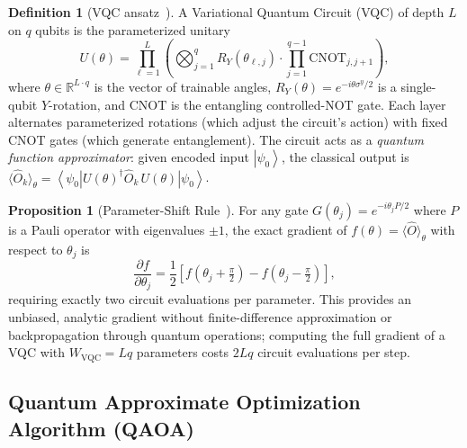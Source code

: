 \documentclass[11pt,a4paper]{article}
\theoremstyle{definition}
\newtheorem{definition}{Definition}[section]
\newtheorem{proposition}{Proposition}[section]
\newcommand{\ket}[1]{\left\lvert #1 \right\rangle}
\newcommand{\bra}[1]{\left\langle #1 \right\rvert}
\begin{document}
\begin{definition}[VQC ansatz~{\cite{vqc_drl}}]
\label{def:vqc_ansatz}
A Variational Quantum Circuit (VQC) of depth $L$ on $q$ qubits is the parameterized unitary
\begin{equation}
  U(\theta) = \prod_{\ell=1}^{L}
  \left(\bigotimes_{j=1}^{q} R_Y(\theta_{\ell,j})
  \cdot \prod_{j=1}^{q-1}\mathrm{CNOT}_{j,j+1}\right),
  \label{eq:vqc_def}
\end{equation}
where $\theta \in \mathbb{R}^{L \cdot q}$ is the vector of trainable angles, $R_Y(\theta)=e^{-i\theta\sigma^y/2}$ is a single-qubit $Y$-rotation, and $\mathrm{CNOT}$ is the entangling controlled-NOT gate. Each layer alternates parameterized rotations (which adjust the circuit's action) with fixed CNOT gates (which generate entanglement). The circuit acts as a \emph{quantum function approximator}: given encoded input $\ket{\psi_0}$, the classical output is $\langle\hat{O}_k\rangle_\theta = \bra{\psi_0}U(\theta)^\dagger\hat{O}_k\,U(\theta)\ket{\psi_0}$.
\end{definition}

\begin{proposition}[Parameter-Shift Rule~{\cite{mitarai2018psr,vqc_drl}}]
\label{prop:psr}
For any gate $G(\theta_j) = e^{-i\theta_j P/2}$ where $P$ is a Pauli operator with eigenvalues $\pm 1$, the exact gradient of $f(\theta) = \langle\hat{O}\rangle_\theta$ with respect to $\theta_j$ is
\begin{equation}
  \frac{\partial f}{\partial \theta_j}
  = \frac{1}{2}\!\left[f\!\left(\theta_j + \tfrac{\pi}{2}\right)
  - f\!\left(\theta_j - \tfrac{\pi}{2}\right)\right],
  \label{eq:psr}
\end{equation}
requiring exactly two circuit evaluations per parameter. This provides an unbiased, analytic gradient without finite-difference approximation or backpropagation through quantum operations; computing the full gradient of a VQC with $W_{\mathrm{VQC}} = Lq$ parameters costs $2Lq$ circuit evaluations per step.
\end{proposition}

\subsection{Quantum Approximate Optimization Algorithm (QAOA)}
\label{subsec:bg_qaoa}
\end{document}
